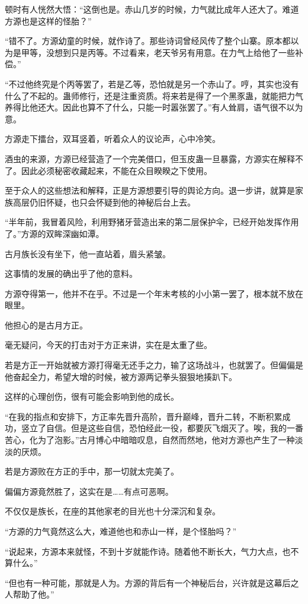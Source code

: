 \begin{this_body}
顿时有人恍然大悟：“这倒也是。赤山几岁的时候，力气就比成年人还大了。难道方源也是这样的怪胎？”

“错不了。方源幼童的时候，就作诗了。那些诗词曾经风传了整个山寨。原本都以为是甲等，没想到只是丙等。不过看来，老天爷另有用意。在力气上给他了一些补偿。”

“不过他终究是个丙等罢了，若是乙等，恐怕就是另一个赤山了。哼，其实也没有什么了不起的。蛊师修行，还是注重资质。将来若是得了一个黑豕蛊，就能把力气养得比他还大。因此也算不了什么，只能一时嚣张罢了。”有人耸肩，语气很不以为意。

方源走下擂台，双耳竖着，听着众人的议论声，心中冷笑。

酒虫的来源，方源已经营造了一个完美借口，但玉皮蛊一旦暴露，方源实在解释不了。因此必须秘密收藏起来，不能在众目睽睽之下使用。

至于众人的这些想法和解释，正是方源想要引导的舆论方向。退一步讲，就算是家族高层仍旧怀疑，也只会怀疑到他的神秘后台上去。

“半年前，我冒着风险，利用野猪牙营造出来的第二层保护伞，已经开始发挥作用了。”方源的双眸深幽如潭。

古月族长没有坐下，他一直站着，眉头紧皱。

这事情的发展的确出乎了他的意料。

方源夺得第一，他并不在乎。不过是一个年末考核的小小第一罢了，根本就不放在眼里。

他担心的是古月方正。

毫无疑问，今天的打击对于方正来讲，实在是太重了些。

若是方正一开始就被方源打得毫无还手之力，输了这场战斗，也就罢了。但偏偏是他奋起全力，希望大增的时候，被方源两记拳头狠狠地揍趴下。

这样的心理创伤，很有可能会影响到他的成长。

“在我的指点和安排下，方正率先晋升高阶，晋升巅峰，晋升二转，不断积累成功，竖立了自信。但是这些自信，恐怕经此一役，都要灰飞烟灭了。唉，我的一番苦心，化为了泡影。”古月博心中暗暗叹息，自然而然地，他对方源也产生了一种淡淡的厌烦。

若是方源败在方正的手中，那一切就太完美了。

偏偏方源竟然胜了，这实在是……有点可恶啊。

不仅仅是族长，在座的其他家老的目光也十分深沉和复杂。

“方源的力气竟然这么大，难道他也和赤山一样，是个怪胎吗？”

“说起来，方源本来就怪，不到十岁就能作诗。随着他不断长大，气力大点，也不算什么。”

“但也有一种可能，那就是人为。方源的背后有一个神秘后台，兴许就是这幕后之人帮助了他。”


\end{this_body}

